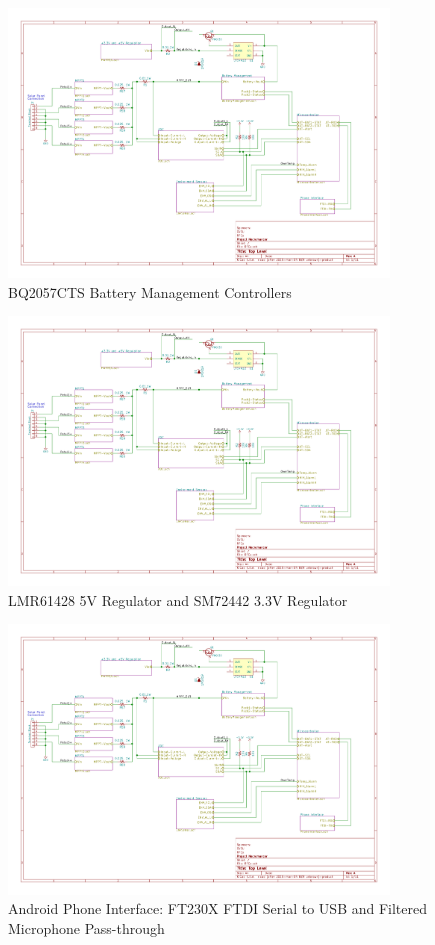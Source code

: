 \documentclass{article}
\numberwithin{figure}{section}
\numberwithin{equation}{section}
\begin{document}
{\begin{figure}[H]
	\centering
	\includegraphics[page=5,width=0.9\textwidth]{RFCxSchematics.pdf}
	\caption{BQ2057CTS Battery Management Controllers}
	\label{fig:schemp5}
\end{figure}

\begin{figure}[H]
	\centering
	\includegraphics[page=6,width=0.9\textwidth]{RFCxSchematics.pdf}
	\caption{LMR61428 5V Regulator and SM72442 3.3V Regulator}
	\label{fig:schemp6}
\end{figure}

\begin{figure}[H]
	\centering
	\includegraphics[page=7,width=0.9\textwidth]{RFCxSchematics.pdf}
	\caption{Android Phone Interface: FT230X FTDI Serial to USB and Filtered Microphone Pass-through}
	\label{fig:schemp7}
\end{figure}

}
\end{document}
